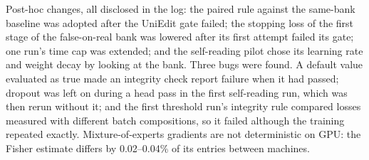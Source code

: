 \documentclass[11pt]{article}
\begin{document}
Post-hoc changes, all disclosed in the log: the paired rule against the same-bank baseline was adopted after the UniEdit gate failed; the stopping loss of the first stage of the false-on-real bank was lowered after its first attempt failed its gate; one run's time cap was extended; and the self-reading pilot chose its learning rate and weight decay by looking at the bank.
Three bugs were found.
A default value evaluated as true made an integrity check report failure when it had passed; dropout was left on during a head pass in the first self-reading run, which was then rerun without it; and the first threshold run's integrity rule compared losses measured with different batch compositions, so it failed although the training repeated exactly.
Mixture-of-experts gradients are not deterministic on GPU: the Fisher estimate differs by 0.02--0.04\% of its entries between machines.
\end{document}
